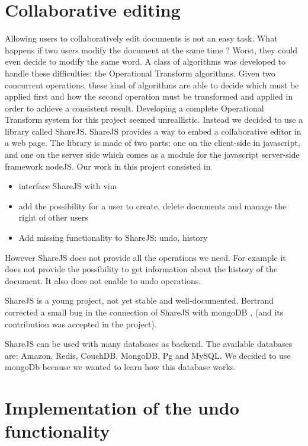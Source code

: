 \documentclass{llncs}
\begin{document}
\section{Collaborative editing}\label{sec:Collabo}

Allowing users to collaboratively edit documents is not an easy task.
What happens if two users modify the document at the same time ?
Worst, they could even decide to modify the same word. A class
of algorithms was developed to handle these difficulties:
the Operational Transform algorithms. Given two concurrent operations, these kind
of algorithms are able to decide which must be applied first and how the second
operation must be transformed and applied in order to achieve a consistent result.
Developing a complete Operational Transform system for this project seemed unreallistic.
Instead we decided to use a library called ShareJS. 
ShareJS provides a way to embed a collaborative editor in a web page.
The library is made of two parts: one on the client-side in javascript, 
and one on the server side which comes as a module for the javascript server-side framework
nodeJS.
Our work in this project consisted in
\begin{itemize}
\item interface ShareJS with vim
\item add the possibility for a user to create, delete documents and manage the right of other users
\item Add missing functionality to ShareJS: undo, history
\end{itemize}

However ShareJS does not provide all the operations we need.
For example it does not provide the possibility to get information about the history of the document.
It also does not enable to undo operations.

ShareJS is a young project, not yet stable and well-documented.
Bertrand corrected a small bug in the connection of ShareJS with mongoDB , (and its contribution was accepted in the project).

ShareJS can be used with many databases as backend. 
The available databases are: Amazon, Redis, CouchDB, MongoDB, Pg and MySQL.
We decided to use mongoDb because we wanted to learn how this database works.

\section{Implementation of the undo functionality}\label{sec:Others}
\end{document}
